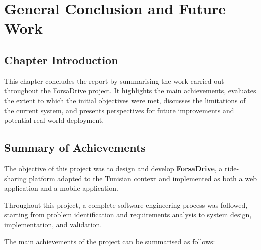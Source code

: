 \chapter{General Conclusion and Future Work}

\section*{Chapter Introduction}

This chapter concludes the report by summarising the work carried out throughout the ForsaDrive project. It highlights the main achievements, evaluates the extent to which the initial objectives were met, discusses the limitations of the current system, and presents perspectives for future improvements and potential real-world deployment.

\section{Summary of Achievements}

The objective of this project was to design and develop \textbf{ForsaDrive}, a ride-sharing platform adapted to the Tunisian context and implemented as both a web application and a mobile application.

Throughout this project, a complete software engineering process was followed, starting from problem identification and requirements analysis to system design, implementation, and validation.

The main achievements of the project can be summarised as follows:

